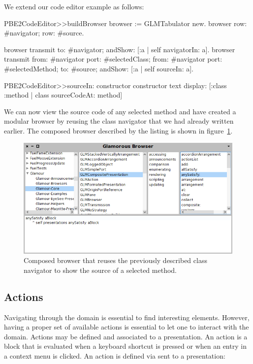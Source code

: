 \documentclass[a4paper,10pt,twoside]{book}
\begin{document}
We extend our code editor example as follows:

\begin{code}{}
PBE2CodeEditor>>buildBrowser 
	browser := GLMTabulator new.
	browser 
		row: #navigator;
		row: #source.
		
	browser transmit to: #navigator; andShow:  [:a | self navigatorIn: a]. 
	browser transmit
		from:  #navigator port: #selectedClass;
		from: #navigator port: #selectedMethod;
		to: #source;
		andShow:  [:a | self sourceIn: a].

PBE2CodeEditor>>sourceIn: constructor
	constructor text
		display: [:class :method | class sourceCodeAt: method] 
\end{code}


We can now view the source code of any selected method and have
created a modular browser by reusing the class navigator that we had
already written earlier. The composed browser described by the listing
is shown in figure~\ref{fig:composed-browser}.

\begin{figure}[htbp]
\centerline{\includegraphics[width=\linewidth]{classbrowser.png}}
\caption{Composed browser that reuses the previously described class navigator to show the source of a selected method.}
\label{fig:composed-browser}
\end{figure}

\subsection{Actions}
\label{sec:tutorial/actions}

Navigating through the domain is essential to find interesting elements. However, having a proper set of available actions is essential to let one to interact with the domain.
Actions may be defined and associated to a presentation. An action is a block that is evaluated when a keyboard shortcut is pressed or when an entry in a context menu is clicked. An action is defined via  sent to a presentation:
\end{document}
